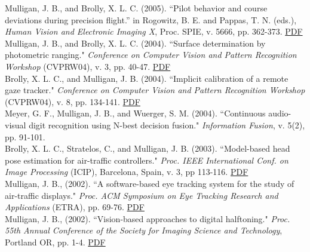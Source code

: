 \documentclass[12pt]{article}
\newcommand{\years}[1]{\marginnote{\scriptsize #1}}
\begin{document}
Mulligan, J. B., and Brolly, X. L. C. (2005).
``Pilot behavior and course deviations during precision flight.”
in Rogowitz, B. E. and Pappas, T. N. (eds.),
\emph{Human Vision and Electronic Imaging X},
Proc. SPIE, v. 5666,
pp. 362-373.  \href{http://scanpath.arc.nasa.gov/pub_files/spie05.pdf}{PDF}\\

\years{2004}
Mulligan, J. B., and Brolly, X. L. C. (2004).
``Surface determination by photometric ranging."
\emph{Conference on Computer Vision and Pattern Recognition Workshop} (CVPRW04),
v. 3, pp. 40-47.  \href{http://scanpath.arc.nasa.gov/pub_files/ranging.pdf}{PDF}\\

Brolly, X. L. C., and Mulligan, J. B. (2004).
``Implicit calibration of a remote gaze tracker."
\emph{Conference on Computer Vision and Pattern Recognition Workshop} (CVPRW04),
v. 8, pp. 134-141.  \href{http://scanpath.arc.nasa.gov/pub_files/galvo.pdf}{PDF}\\

\clearpage
Meyer, G. F., Mulligan, J. B., and Wuerger, S. M. (2004).
``Continuous audio-visual digit recognition using N-best decision fusion."
\emph{Information Fusion}, v. 5(2), pp. 91-101.\\

\years{2003}
Brolly, X. L. C., Stratelos, C., and Mulligan, J. B. (2003).
``Model-based head pose estimation for air-traffic controllers."
\emph{Proc. IEEE International Conf. on Image Processing} (ICIP),
Barcelona, Spain, v. 3, pp 113-116.  \href{http://scanpath.arc.nasa.gov/pub_files/icip03.pdf}{PDF}\\

\years{2002}
Mulligan, J. B., (2002).
``A software-based eye tracking system for the study of air-traffic displays."
\emph{Proc. ACM Symposium on Eye Tracking Research and Applications} (ETRA),
pp. 69-76.  \href{http://scanpath.arc.nasa.gov/pub_files/etra02jbm.pdf}{PDF}\\

Mulligan, J. B., (2002).
``Vision-based approaches to digital halftoning."
\emph{Proc. 55th Annual Conference
of the Society for Imaging Science and Technology},
Portland OR, pp. 1-4.  \href{http://scanpath.arc.nasa.gov/pub_files/pics02_jbm.pdf}{PDF}\\
\end{document}
